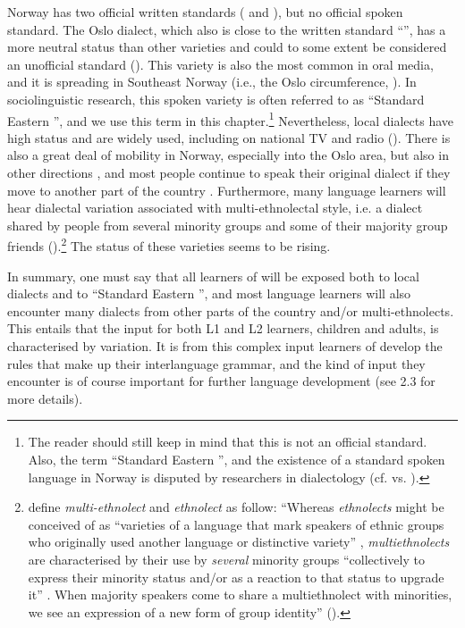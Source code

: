 \documentclass[output=paper,colorlinks,citecolor=brown,modfonts,nonflat]{../langscibook}
\begin{document}
\largerpage
Norway has two official written standards ( and ), but no official spoken standard. The Oslo dialect, which also is close to the written standard ``'', has a more neutral status than other varieties and could to some extent be considered an unofficial standard (\citealt{Mæhlum2009, Røyneland2009}). This variety is also the most common in oral media, and it is spreading in Southeast Norway (i.e., the Oslo circumference, \citealt{Mæhlum2009}). In  sociolinguistic research, this spoken variety is often referred to as ``Standard Eastern '', and we use this term in this chapter.\footnote{{The reader should still keep in mind that this is not an official standard. Also, the term ``Standard Eastern '', and the existence of a standard spoken language in Norway is disputed by researchers in  dialectology (cf. \citealt{Mæhlum2009} vs. \citealt{Sandøy2009}).} } Nevertheless, local dialects have high status and are widely used, including on national TV and radio (\citealt{Røyneland2009, Sandøy2011}). There is also a great deal of mobility in Norway, especially into the Oslo area, but also in other directions \citep{Stjernholm2013}, and most people continue to speak their original dialect if they move to another part of the country \citep[7]{Jahr1990}. Furthermore, many language learners will hear dialectal variation associated with multi-ethnolectal style, i.e. a dialect shared by people from several minority groups and some of their majority group friends (\citealt{SvendsenRøyneland2008, OpsahlNistov2010}).\footnote{{\citeauthor{SvendsenRøyneland2008} define} \textit{multi-ethnolect} and \textit{ethnolect} {as follow: “Whereas} {\textit{ethnolects}} {might be conceived of as “varieties of a language that mark speakers of ethnic groups who originally used another language or distinctive variety” \citep[86]{Clyne2000},} {\textit{multiethnolects}} {are characterised by their use by} {\textit{several}} {minority groups “collectively to express their minority status and/or as a reaction to that status to upgrade it” \citep[87]{Clyne2000}. When majority speakers come to share a multiethnolect with minorities, we see an expression of a new form of group identity” (\citealt[64]{SvendsenRøyneland2008}).}} The status of these varieties seems to be rising.

In summary, one must say that all learners of  will be exposed both to local dialects and to ``Standard Eastern '', and most language learners will also encounter many dialects from other parts of the country and/or multi-ethnolects. This entails that the input for both L1 and L2 learners, children and adults, is characterised by variation. It is from this complex input learners of  develop the rules that make up their interlanguage grammar, and the kind of input they encounter is of course important for further language development (see 2.3 for more details).
\end{document}
